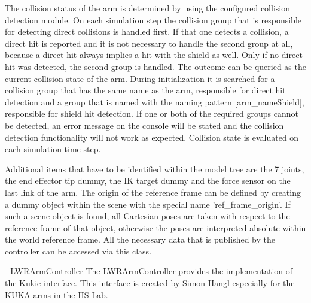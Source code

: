   The collision status of the arm is determined by using the configured collision detection module.
  On each simulation step the collision group that is responsible for detecting direct collisions is 
  handled first. If that one detects a collision, a direct hit is reported and it is not necessary
  to handle the second group at all, because a direct hit always implies a hit with the shield as
  well. Only if no direct hit was detected, the second group is handled. The outcome can be queried
  as the current collision state of the arm. During initialization it is searched for a collision
  group that has the same name as the arm, responsible for direct hit detection and a group that is
  named with the naming pattern [arm\_nameShield], responsible for shield hit detection. If one or
  both of the required groups cannot be detected, an error message on the console will be stated and
  the collision detection functionality will not work as expected. Collision state is evaluated on 
  each simulation time step.
  
  Additional items that have to be identified within the model tree are the 7 joints, the end
  effector tip dummy, the IK target dummy and the force sensor on the last link of the arm. The
  origin of the reference frame can be defined by creating a dummy object within the scene with
  the special name 'ref\_frame\_origin'. If such a scene object is found, all Cartesian poses are
  taken with respect to the reference frame of that object, otherwise the poses are interpreted
  absolute within the world reference frame. All the necessary data that is published by the 
  controller can be accessed via this class.
  
- LWRArmController
  The LWRArmController provides the implementation of the Kukie interface. This interface is created
  by Simon Hangl especially for the KUKA arms in the IIS Lab.
  
